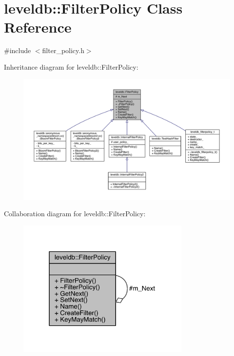 \hypertarget{classleveldb_1_1_filter_policy}{}\section{leveldb\+:\+:Filter\+Policy Class Reference}
\label{classleveldb_1_1_filter_policy}


{\ttfamily \#include $<$filter\+\_\+policy.\+h$>$}



Inheritance diagram for leveldb\+:\+:Filter\+Policy\+:
\nopagebreak
\begin{figure}[H]
\begin{center}
\leavevmode
\includegraphics[width=350pt]{classleveldb_1_1_filter_policy__inherit__graph}
\end{center}
\end{figure}


Collaboration diagram for leveldb\+:\+:Filter\+Policy\+:\nopagebreak
\begin{figure}[H]
\begin{center}
\leavevmode
\includegraphics[width=243pt]{classleveldb_1_1_filter_policy__coll__graph}
\end{center}
\end{figure}
